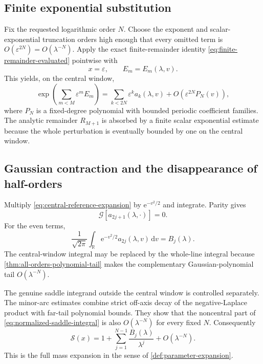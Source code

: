 \documentclass[11pt,oneside]{article}
\theoremstyle{definition}
\theoremstyle{remark}
\newcommand{\R}{\mathbb R}
\newcommand{\e}{\mathrm e}
\newcommand{\dd}{\,\mathrm d}
\newcommand{\Gcal}{\mathcal G}
\begin{document}
\subsection{Finite exponential substitution}

Fix the requested logarithmic order $N$.  Choose the exponent and scalar-exponential
truncation orders high enough that every omitted term is
$O(\varepsilon^{2N})=O(\lambda^{-N})$.  Apply the exact finite-remainder identity
\eqref{eq:finite-remainder-evaluated} pointwise with
\begin{equation}
 x=\varepsilon,
 \qquad
 E_m=E_m(\lambda,v).
 \label{eq:finite-exp-saddle-substitution}
\end{equation}
This yields, on the central window,
\begin{equation}
 \exp\!\left(\sum_{m<M}\varepsilon^mE_m\right)
 =\sum_{k<2N}\varepsilon^ka_k(\lambda,v)
 +O\!\left(\varepsilon^{2N}P_N(v)\right),
 \label{eq:central-reference-expansion}
\end{equation}
where $P_N$ is a fixed-degree polynomial with bounded periodic coefficient families.  The
analytic remainder $R_{M+1}$ is absorbed by a finite scalar exponential estimate because the
whole perturbation is eventually bounded by one on the central window.

\subsection{Gaussian contraction and the disappearance of half-orders}

Multiply \eqref{eq:central-reference-expansion} by $\e^{-v^2/2}$ and integrate.  Parity gives
\begin{equation}
 \Gcal[a_{2j+1}(\lambda,\cdot)]=0.
 \label{eq:odd-saddle-contractions-zero}
\end{equation}
For the even terms,
\begin{equation}
 \frac1{\sqrt{2\pi}}
 \int_\R\e^{-v^2/2}a_{2j}(\lambda,v)\dd v=B_j(\lambda).
 \label{eq:even-saddle-contraction}
\end{equation}
The central-window integral may be replaced by the whole-line integral because
\cref{thm:all-orders-polynomial-tail} makes the complementary Gaussian-polynomial tail
$O(\lambda^{-N})$.

The genuine saddle integrand outside the central window is controlled separately.  The
minor-arc estimates combine strict off-axis decay of the negative-Laplace product with
far-tail polynomial bounds.  They show that the noncentral part of
\eqref{eq:normalized-saddle-integral} is also $O(\lambda^{-N})$ for every fixed $N$.
Consequently
\begin{equation}
 \mathcal S(x)=
 1+\sum_{j=1}^{N-1}\frac{B_j(\lambda)}{\lambda^j}
 +O(\lambda^{-N}).
 \label{eq:full-mass-expansion-supp}
\end{equation}
This is the full mass expansion in the sense of \cref{def:parameter-expansion}.
\end{document}
